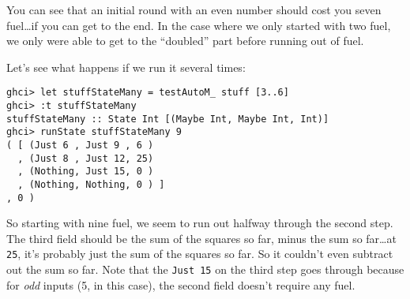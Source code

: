 \documentclass[]{article}
\newenvironment{Shaded}{}{}
\newcommand{\KeywordTok}[1]{\textcolor[rgb]{0.00,0.44,0.13}{\textbf{{#1}}}}
\newcommand{\DataTypeTok}[1]{\textcolor[rgb]{0.56,0.13,0.00}{{#1}}}
\newcommand{\DecValTok}[1]{\textcolor[rgb]{0.25,0.63,0.44}{{#1}}}
\newcommand{\CommentTok}[1]{\textcolor[rgb]{0.38,0.63,0.69}{\textit{{#1}}}}
\newcommand{\OtherTok}[1]{\textcolor[rgb]{0.00,0.44,0.13}{{#1}}}
\newcommand{\FunctionTok}[1]{\textcolor[rgb]{0.02,0.16,0.49}{{#1}}}
\newcommand{\NormalTok}[1]{{#1}}
\begin{document}
\begin{Shaded}
\end{Shaded}

You can see that an initial round with an even number should cost you
seven fuel\ldots{}if you can get to the end. In the case where we only
started with two fuel, we only were able to get to the ``doubled'' part
before running out of fuel.

Let's see what happens if we run it several times:

\begin{verbatim}
ghci> let stuffStateMany = testAutoM_ stuff [3..6]
ghci> :t stuffStateMany
stuffStateMany :: State Int [(Maybe Int, Maybe Int, Int)]
ghci> runState stuffStateMany 9
( [ (Just 6 , Just 9 , 6 )
  , (Just 8 , Just 12, 25)
  , (Nothing, Just 15, 0 )
  , (Nothing, Nothing, 0 ) ]
, 0 )
\end{verbatim}

So starting with nine fuel, we seem to run out halfway through the
second step. The third field should be the sum of the squares so far,
minus the sum so far\ldots{}at \texttt{25}, it's probably just the sum
of the squares so far. So it couldn't even subtract out the sum so far.
Note that the \texttt{Just\ 15} on the third step goes through because
for \emph{odd} inputs (5, in this case), the second field doesn't
require any fuel.
\end{document}
